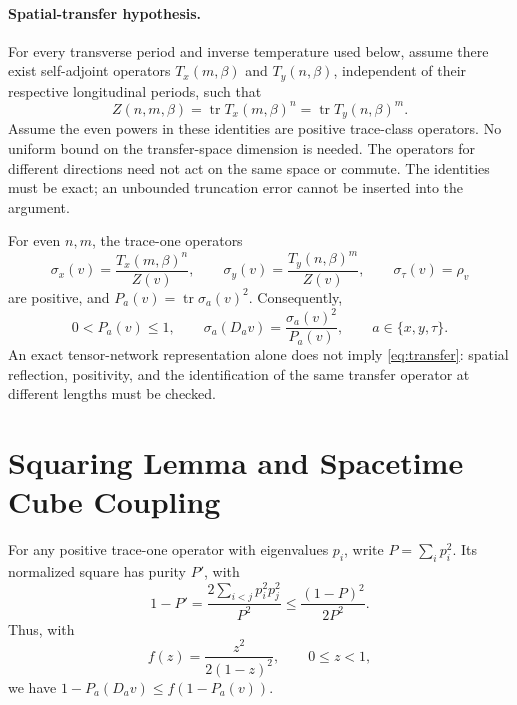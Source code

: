 \documentclass[11pt]{article}
\newcommand{\tr}{\operatorname{tr}}
\begin{document}
\paragraph{Spatial-transfer hypothesis.}
For every transverse period and inverse temperature used below, assume
there exist self-adjoint operators \(T_x(m,\beta)\) and
\(T_y(n,\beta)\), independent of their respective longitudinal periods,
such that
\begin{equation}
	Z(n,m,\beta)=\tr T_x(m,\beta)^n
	=\tr T_y(n,\beta)^m.
	\label{eq:transfer}
\end{equation}
Assume the even powers in these identities are positive trace-class
operators. No uniform bound on the transfer-space dimension is needed.
The operators for different directions need not act on the same space
or commute. The identities must be exact; an unbounded truncation error
cannot be inserted into the argument.

For even \(n,m\), the trace-one operators
\[
	\sigma_x(v)=\frac{T_x(m,\beta)^n}{Z(v)},\qquad
	\sigma_y(v)=\frac{T_y(n,\beta)^m}{Z(v)},\qquad
	\sigma_\tau(v)=\rho_v
\]
are positive, and \(P_a(v)=\tr\sigma_a(v)^2\). Consequently,
\begin{equation}
	0<P_a(v)\le1,\qquad
	\sigma_a(D_av)=\frac{\sigma_a(v)^2}{P_a(v)},
	\qquad a\in\{x,y,\tau\}.
	\label{eq:square-states}
\end{equation}
An exact tensor-network representation alone does not imply
\eqref{eq:transfer}: spatial reflection, positivity, and the identification
of the same transfer operator at different lengths must be checked.

\section{Squaring Lemma and Spacetime Cube Coupling}

For any positive trace-one operator with eigenvalues \(p_i\), write
\(P=\sum_i p_i^2\). Its normalized square has purity \(P'\), with
\[
	1-P'=\frac{2\sum_{i<j}p_i^2p_j^2}{P^2}
	\le\frac{(1-P)^2}{2P^2}.
\]
Thus, with
\begin{equation}
	f(z)=\frac{z^2}{2(1-z)^2},\qquad 0\le z<1,
	\label{eq:f}
\end{equation}
we have \(1-P_a(D_av)\le f(1-P_a(v))\).
\end{document}
